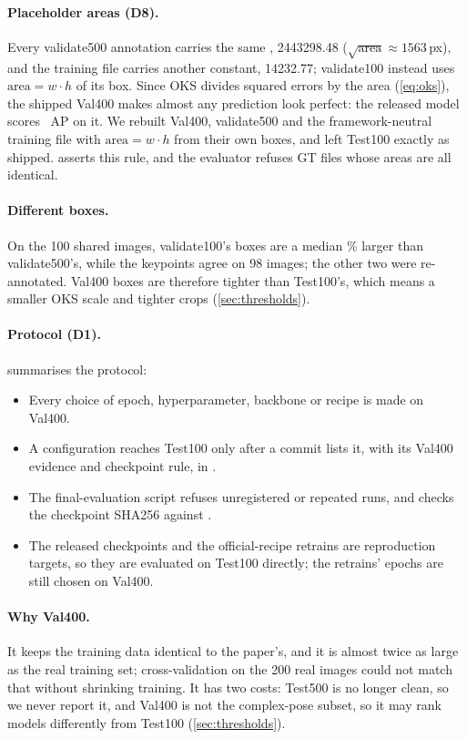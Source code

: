 \paragraph{Placeholder areas (D8).} Every validate500 annotation carries the same , 2443298.48 ($\sqrt{\text{area}}\approx1563$\,px), and the training file carries another constant, 14232.77; validate100 instead uses $\text{area}=w\cdot h$ of its box.
Since OKS divides squared errors by the area (\cref{eq:oks}), the shipped Val400 makes almost any prediction look perfect: the released model scores ~AP on it.
We rebuilt Val400, validate500 and the framework-neutral training file with $\text{area}=w\cdot h$ from their own boxes, and left Test100 exactly as shipped.  asserts this rule, and the evaluator refuses GT files whose areas are all identical.

\paragraph{Different boxes.} On the 100 shared images, validate100's boxes are a median \% larger than validate500's, while the keypoints agree on 98 images; the other two were re-annotated. Val400 boxes are therefore tighter than Test100's, which means a smaller OKS scale and tighter crops (\cref{sec:thresholds}).

\paragraph{Protocol (D1).}  summarises the protocol:
\begin{itemize}[leftmargin=*]
  \item Every choice of epoch, hyperparameter, backbone or recipe is made on Val400.
  \item A configuration reaches Test100 only after a commit lists it, with its Val400 evidence and checkpoint rule, in .
  \item The final-evaluation script refuses unregistered or repeated runs, and checks the checkpoint SHA256 against .
  \item The released checkpoints and the official-recipe retrains are reproduction targets, so they are evaluated on Test100 directly; the retrains' epochs are still chosen on Val400.
\end{itemize}

\paragraph{Why Val400.} It keeps the training data identical to the paper's, and it is almost twice as large as the real training set; cross-validation on the 200 real images could not match that without shrinking training.
It has two costs: Test500 is no longer clean, so we never report it, and Val400 is not the complex-pose subset, so it may rank models differently from Test100 (\cref{sec:thresholds}).



